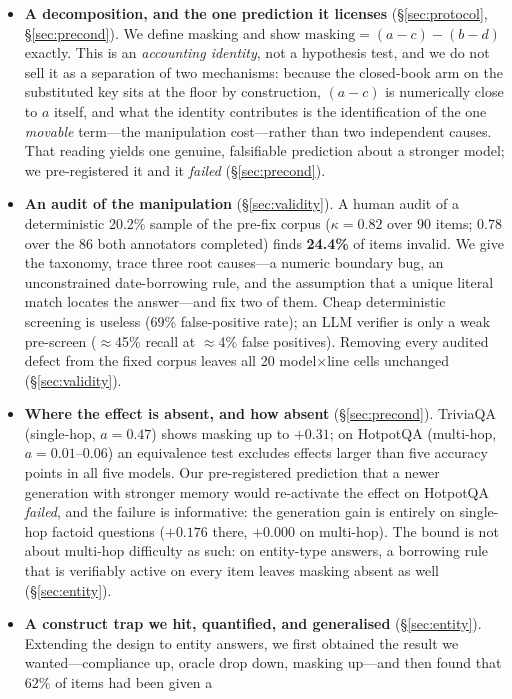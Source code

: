 \documentclass[11pt]{article}
\newcommand{\mask}{\ensuremath{\mathrm{masking}}}
\begin{document}
\begin{itemize}\itemsep2pt
\item \textbf{A decomposition, and the one prediction it licenses} (\S\ref{sec:protocol},
\S\ref{sec:precond}). We define masking and show $\mask = (a-c)-(b-d)$ exactly. This is an
\emph{accounting identity}, not a hypothesis test, and we do not sell it as a separation of
two mechanisms: because the closed-book arm on the substituted key sits at the floor by
construction, $(a-c)$ is numerically close to $a$ itself, and what the identity contributes
is the identification of the one \emph{movable} term---the manipulation cost---rather than
two independent causes. That reading yields one genuine, falsifiable
prediction about a stronger model; we pre-registered it and it \emph{failed}
(\S\ref{sec:precond}).
\item \textbf{An audit of the manipulation} (\S\ref{sec:validity}). A human audit of a
deterministic 20.2\% sample of the pre-fix corpus ($\kappa{=}0.82$ over 90 items; $0.78$
over the 86 both
annotators completed) finds \textbf{24.4\%} of items invalid. We give the taxonomy, trace
three root causes---a numeric boundary bug, an unconstrained date-borrowing rule, and the
assumption that a unique literal match locates the answer---and fix two of them. Cheap
deterministic screening is useless (69\% false-positive rate); an LLM verifier is only a
weak pre-screen ($\approx$45\% recall at $\approx$4\% false positives). Removing every
audited defect from the fixed corpus leaves all 20 model$\times$line cells unchanged
(\S\ref{sec:validity}).
\item \textbf{Where the effect is absent, and how absent} (\S\ref{sec:precond}). TriviaQA
(single-hop, $a{=}0.47$) shows masking up to $+0.31$; on HotpotQA (multi-hop, $a{=}0.01$--$0.06$)
an equivalence test excludes effects larger than five accuracy points in all five models.
Our pre-registered prediction that a newer generation with stronger memory would
re-activate the effect on HotpotQA \emph{failed}, and the failure is informative: the
generation gain is entirely on single-hop factoid questions ($+0.176$ there, $+0.000$ on
multi-hop). The bound is not about multi-hop difficulty as such: on entity-type answers,
a borrowing rule that is verifiably active on every item leaves masking absent as well
(\S\ref{sec:entity}).
\item \textbf{A construct trap we hit, quantified, and generalised} (\S\ref{sec:entity}).
Extending the design to entity answers, we first obtained the result we wanted---compliance
up, oracle drop down, masking up---and then found that $62\%$ of items had been given a

\end{itemize}
\end{document}

